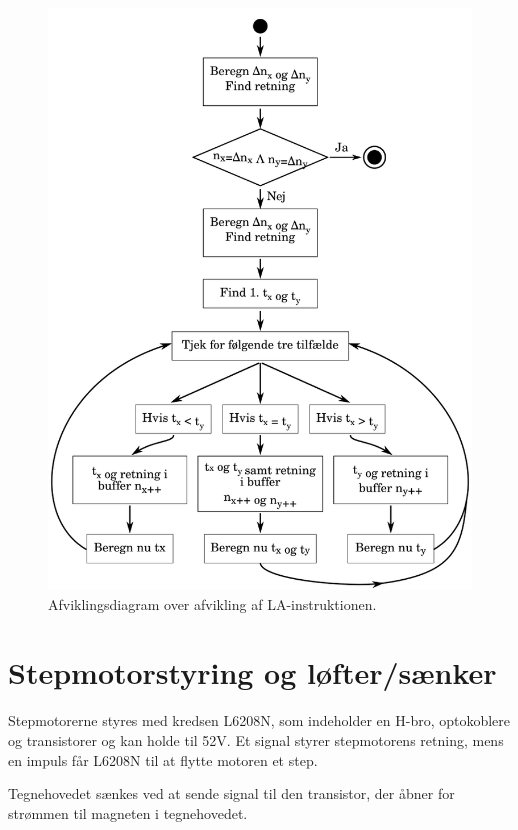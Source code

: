 \begin{figure}[htbp]
  \centering
  \includegraphics[width=.75\textwidth]{./img/la-behandling}
  \caption{Afviklingsdiagram over afvikling af LA-instruktionen.}
  \label{fig:la-behandling}
\end{figure}


\section{Stepmotorstyring og løfter/sænker}


Stepmotorerne styres med kredsen L6208N, som indeholder en H-bro,
optokoblere og transistorer og kan holde til 52V. Et signal styrer
stepmotorens retning, mens en impuls får L6208N til at flytte motoren
et step.

Tegnehovedet sænkes ved at sende signal til den transistor, der åbner
for strømmen til magneten i tegnehovedet.



